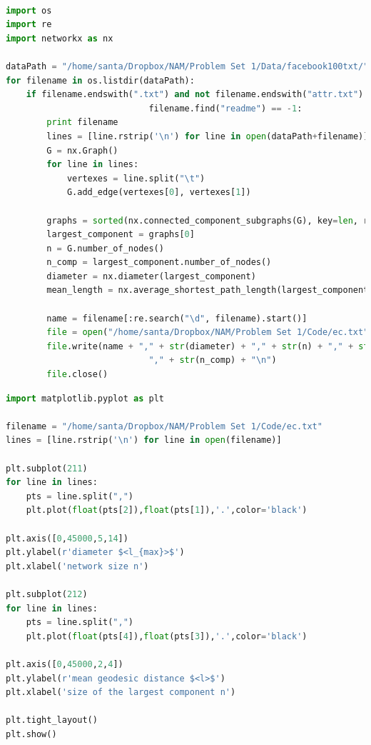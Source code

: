 \documentclass{article}
\begin{document}
\begin{lstlisting}[language=Python, caption=To write data to a file]

import os
import re
import networkx as nx

dataPath = "/home/santa/Dropbox/NAM/Problem Set 1/Data/facebook100txt/"
for filename in os.listdir(dataPath):
    if filename.endswith(".txt") and not filename.endswith("attr.txt") and 
    						filename.find("readme") == -1:
        print filename
        lines = [line.rstrip('\n') for line in open(dataPath+filename)]
        G = nx.Graph()
        for line in lines:
            vertexes = line.split("\t")
            G.add_edge(vertexes[0], vertexes[1])
        
        graphs = sorted(nx.connected_component_subgraphs(G), key=len, reverse=True)
        largest_component = graphs[0]
        n = G.number_of_nodes()
        n_comp = largest_component.number_of_nodes()
        diameter = nx.diameter(largest_component)
        mean_length = nx.average_shortest_path_length(largest_component)
        
        name = filename[:re.search("\d", filename).start()]
        file = open("/home/santa/Dropbox/NAM/Problem Set 1/Code/ec.txt", "a")
        file.write(name + "," + str(diameter) + "," + str(n) + "," + str(mean_length) + 
        					"," + str(n_comp) + "\n")
        file.close()
\end{lstlisting}

\bigskip
\begin{lstlisting}[language=Python, caption=To plot the data]
import matplotlib.pyplot as plt

filename = "/home/santa/Dropbox/NAM/Problem Set 1/Code/ec.txt"
lines = [line.rstrip('\n') for line in open(filename)]

plt.subplot(211)
for line in lines:
    pts = line.split(",")
    plt.plot(float(pts[2]),float(pts[1]),'.',color='black')

plt.axis([0,45000,5,14])
plt.ylabel(r'diameter $<l_{max}>$')
plt.xlabel('network size n')

plt.subplot(212)
for line in lines:
    pts = line.split(",")
    plt.plot(float(pts[4]),float(pts[3]),'.',color='black')

plt.axis([0,45000,2,4])
plt.ylabel(r'mean geodesic distance $<l>$')
plt.xlabel('size of the largest component n')

plt.tight_layout()
plt.show()
\end{lstlisting}
\end{document}
